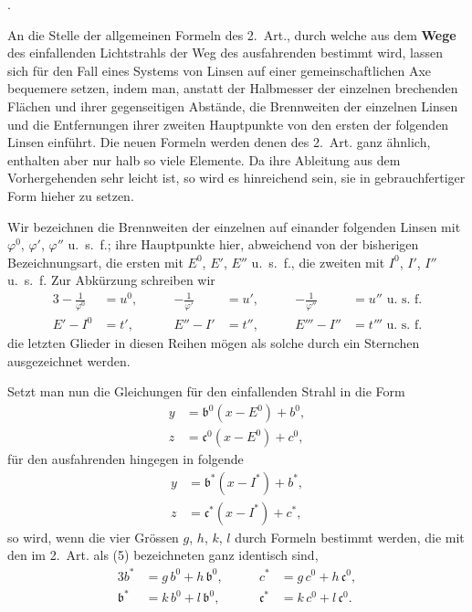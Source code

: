 \documentclass[11pt,a4paper]{article}
\begin{document}
\bigskip{}.

\smallskip
An die Stelle der allgemeinen Formeln des 2.~Art., durch welche aus dem \textbf{Wege} des einfallenden Lichtstrahls der Weg des ausfahrenden bestimmt wird, lassen sich für den Fall eines Systems von Linsen auf einer gemeinschaftlichen Axe bequemere setzen, indem man, anstatt der Halbmesser der einzelnen brechenden Flächen und ihrer gegenseitigen Abstände, die Brennweiten der einzelnen Linsen und die Entfernungen ihrer zweiten Hauptpunkte von den ersten der folgenden Linsen einführt. Die neuen Formeln werden denen des 2.~Art. ganz ähnlich, enthalten aber nur halb so viele Elemente. Da ihre Ableitung aus dem Vorhergehenden sehr leicht ist, so wird es hinreichend sein, sie in gebrauchfertiger Form hieher zu setzen.

Wir bezeichnen die Brennweiten der einzelnen auf einander folgenden Linsen mit $\varphi^0$, $\varphi'$, $\varphi''$ u.~s.~f.; ihre Hauptpunkte hier, abweichend von der bisherigen Bezeichnungsart, die ersten mit $E^0$, $E'$, $E''$ u.~s.~f., die zweiten mit $I^0$, $I'$, $I''$ u.~s.~f. Zur Abkürzung schreiben wir
\begin{alignat*}{3}
-\tfrac{1}{\varphi^0} &= u^0, \qquad & -\tfrac{1}{\varphi'} &= u', \qquad & -\tfrac{1}{\varphi''} &= u'' \text{ u.~s.~f.} \\
E' - I^0 &= t', & E'' - I' &= t'', & E''' - I'' &= t''' \text{ u.~s.~f.}
\end{alignat*}
die letzten Glieder in diesen Reihen mögen als solche durch ein Sternchen ausgezeichnet werden.

\newpage
\noindent
Setzt man nun die Gleichungen für den einfallenden Strahl in die Form
\begin{align*}
y &= \mathfrak{b}^0(x - E^0) + b^0, \\
z &= \mathfrak{c}^0(x - E^0) + c^0,
\end{align*}
für den ausfahrenden hingegen in folgende
\begin{align*}
y &= \mathfrak{b}^*(x - I^*) + b^*, \\
z &= \mathfrak{c}^*(x - I^*) + c^*,
\end{align*}
so wird, wenn die vier Grössen $g$, $h$, $k$, $l$ durch Formeln bestimmt werden, die mit den im 2.~Art. als (5) bezeichneten ganz identisch sind,
\begin{alignat*}{3}
b^* &= g\,b^0 + h\,\mathfrak{b}^0, \qquad & c^* &= g\,c^0 + h\,\mathfrak{c}^0, \\
\mathfrak{b}^* &= k\,b^0 + l\,\mathfrak{b}^0, & \mathfrak{c}^* &= k\,c^0 + l\,\mathfrak{c}^0.
\end{alignat*}
\end{document}
